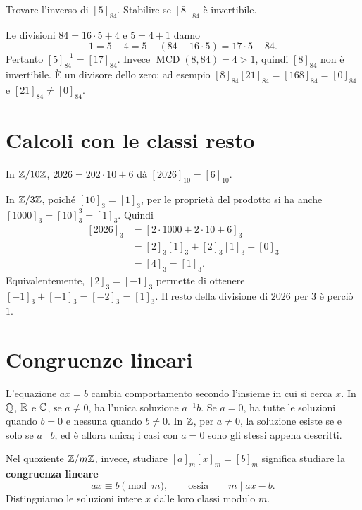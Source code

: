 \begin{esercizio}
Trovare l'inverso di $[5]_{84}$. Stabilire se $[8]_{84}$ è invertibile.
\end{esercizio}
\begin{svolgimento}
Le divisioni $84=16\cdot5+4$ e $5=4+1$ danno
\[
1=5-4=5-(84-16\cdot5)=17\cdot5-84.
\]
Pertanto $[5]_{84}^{-1}=[17]_{84}$. Invece $\operatorname{MCD}(8,84)=4>1$, quindi $[8]_{84}$ non è invertibile. È un divisore dello zero: ad esempio $[8]_{84}[21]_{84}=[168]_{84}=[0]_{84}$ e $[21]_{84}\ne[0]_{84}$.
\end{svolgimento}

\section{Calcoli con le classi resto}
\begin{esempio}[Il numero 2026]
In $\mathbb{Z}/10\mathbb{Z}$, $2026=202\cdot10+6$ dà $[2026]_{10}=[6]_{10}$.

In $\mathbb{Z}/3\mathbb{Z}$, poiché $[10]_3=[1]_3$, per le proprietà del prodotto si ha anche $[1000]_3=[10]_3^3=[1]_3$. Quindi
\[
\begin{aligned}
[2026]_3&=[2\cdot1000+2\cdot10+6]_3\\
&=[2]_3[1]_3+[2]_3[1]_3+[0]_3\\
&=[4]_3=[1]_3.
\end{aligned}
\]
Equivalentemente, $[2]_3=[-1]_3$ permette di ottenere $[-1]_3+[-1]_3=[-2]_3=[1]_3$. Il resto della divisione di $2026$ per $3$ è perciò $1$.
\end{esempio}

\section{Congruenze lineari}
L'equazione $ax=b$ cambia comportamento secondo l'insieme in cui si cerca $x$. In $\mathbb{Q}$, $\mathbb{R}$ e $\mathbb{C}$, se $a\ne0$, ha l'unica soluzione $a^{-1}b$. Se $a=0$, ha tutte le soluzioni quando $b=0$ e nessuna quando $b\ne0$. In $\mathbb{Z}$, per $a\ne0$, la soluzione esiste se e solo se $a\mid b$, ed è allora unica; i casi con $a=0$ sono gli stessi appena descritti.

Nel quoziente $\mathbb{Z}/m\mathbb{Z}$, invece, studiare $[a]_m[x]_m=[b]_m$ significa studiare la \textbf{congruenza lineare}
\[
ax\equiv b\pmod m,\qquad\text{ossia}\qquad m\mid ax-b.
\]
Distinguiamo le soluzioni intere $x$ dalle loro classi modulo $m$.

